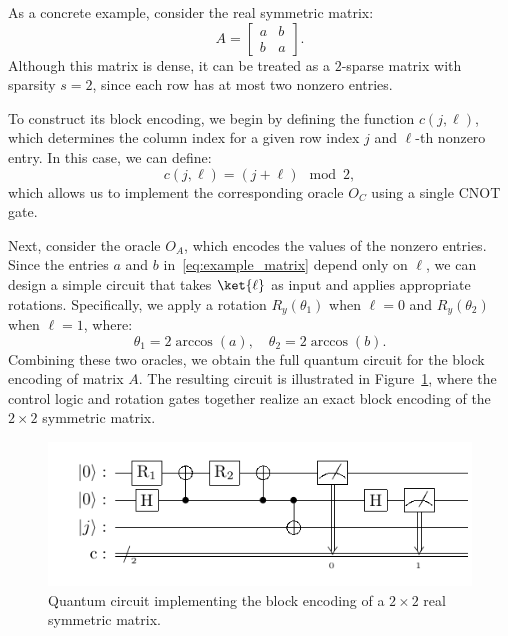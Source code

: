\documentclass{article}
\begin{document}
As a concrete example, consider the real symmetric matrix:
\begin{equation}
  A =
  \begin{bmatrix}
    a & b \\
    b & a
  \end{bmatrix}.\label{eq:example_matrix}
\end{equation}
Although this matrix is dense, it can be treated as a $2$-sparse matrix with sparsity $s = 2$, since each row has at most two nonzero entries.

To construct its block encoding, we begin by defining the function $c(j, \ell)$, which determines the column index for a given row index $j$ and $\ell$-th nonzero entry. In this case, we can define:
\begin{equation}
  c(j,\ell) = (j + \ell) \mod 2,\label{eq:equation12}
\end{equation}
which allows us to implement the corresponding oracle $O_C$ using a single CNOT gate.

Next, consider the oracle $O_A$, which encodes the values of the nonzero entries. Since the entries $a$ and $b$ in~\eqref{eq:example_matrix} depend only on $\ell$, we can design a simple circuit that takes $\ket{\ell}$ as input and applies appropriate rotations. Specifically, we apply a rotation $R_y(\theta_1)$ when $\ell = 0$ and $R_y(\theta_2)$ when $\ell = 1$, where:
\begin{equation}
\theta_1 = 2\arccos(a), \quad \theta_2 = 2\arccos(b).
\end{equation}
Combining these two oracles, we obtain the full quantum circuit for the block encoding of matrix $A$. The resulting circuit is illustrated in Figure~\ref{fig:2x2_circuit}, where the control logic and rotation gates together realize an exact block encoding of the $2 \times 2$ symmetric matrix.

\begin{figure}[htbp]
  \centering
  \includegraphics{pdf/2x2_circuit}
  \caption{Quantum circuit implementing the block encoding of a $2\times2$ real symmetric matrix.}
  \label{fig:2x2_circuit}
\end{figure}
\end{document}
